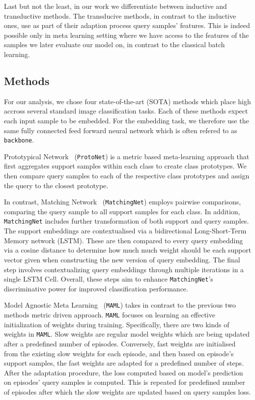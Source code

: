 \documentclass{article}
\begin{document}
Last but not the least, in our work we differentiate between inductive and transductive methods. The transducive methods, in contrast to the inductive ones, use as part of their adaption process query samples' features. This is indeed possible only in meta learning setting where we have access to the features of the samples we later evaluate our model on, in contrast to the classical batch learning.

\subsection{Methods}
For our analysis, we chose four state-of-the-art (SOTA) methods which place high accross several standard image classification tasks. Each of these methods expect each input sample to be embedded. For the embedding task, we therefore use the same fully connected feed forward neural network which is often refered to as \texttt{backbone}.

Prototypical Network~\cite{protonet} (\texttt{ProtoNet}) is a metric based meta-learning approach that first aggregates support samples within each class to create class prototypes. We then compare query samples to each of the respective class prototypes and assign the query to the closest prototype.

In contrast, Matching Network~\cite{matchingnet} (\texttt{MatchingNet}) employs pairwise comparisons, comparing the query sample to all support samples for each class. In addition, \texttt{MatchingNet} includes further transformation of both support and query samples. The support embeddings are contextualised via a bidirectional Long-Short-Term Memory network (LSTM). These are then compared to every query embedding via a cosine distance to determine how much much weight should be each support vector given when constructing the new version of query embedding. The final step involves contextualizing query embeddings through multiple iterations in a single LSTM Cell. Overall, these steps aim to enhance \texttt{MatchingNet}'s discriminative power for improved classification performance.

Model Agnostic Meta Learning~\cite{maml} (\texttt{MAML}) takes in contrast to the previous two methods metric driven approach. \texttt{MAML} focuses on learning an effective initialization of weights during training. Specifically, there are two kinds of weights in \texttt{MAML}. Slow weights are regular model weights which are being updated after a predefined number of episodes. Conversely, fast weights are initialised from the existing slow weights for each episode, and then based on episode's support samples, the fast weights are adapted for a predefined number of steps. After the adaptation procedure, the loss computed based on model's prediction on episodes' query samples is computed. This is repeated for predefined number of episodes after which the slow weights are updated based on query samples loss.
\end{document}
